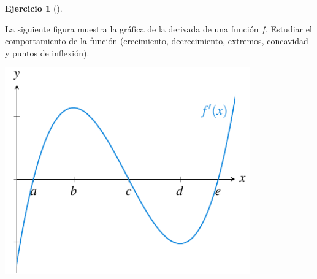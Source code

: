 \documentclass[
  a4paper,
]{scrreport}
\theoremstyle{definition}
\newtheorem{exercise}{Ejercicio}[chapter]
\theoremstyle{remark}
\begin{document}
\begin{exercise}[]\protect\hypertarget{exr-extremos-1}{}\label{exr-extremos-1}

La siguiente figura muestra la gráfica de la derivada de una función
\(f\). Estudiar el comportamiento de la función (crecimiento,
decrecimiento, extremos, concavidad y puntos de inflexión).

\includegraphics[width=4.16667in,height=\textheight]{./img/derivadas/grafica-ext-1.pdf}

\end{exercise}
\end{document}
